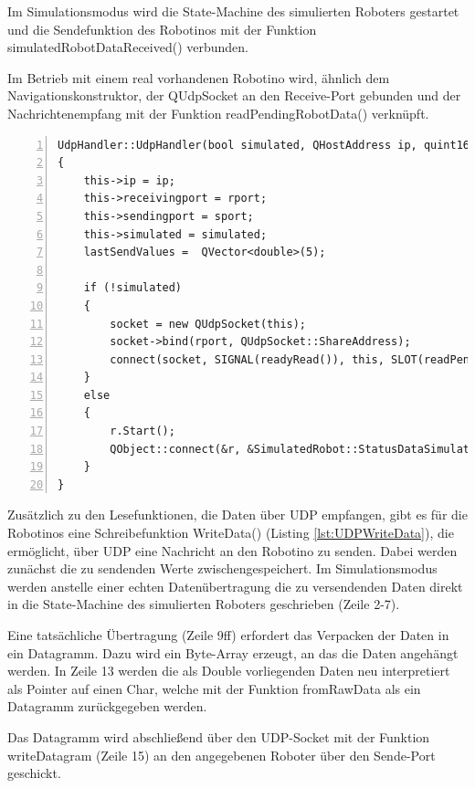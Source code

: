 Im Simulationsmodus wird die State-Machine des simulierten Roboters gestartet und die Sendefunktion des Robotinos mit der Funktion simulatedRobotDataReceived() verbunden.

Im Betrieb mit einem real vorhandenen Robotino wird, ähnlich dem Navigationskonstruktor, der QUdpSocket an den Receive-Port gebunden und der Nachrichtenempfang mit der Funktion readPendingRobotData() verknüpft. 

\begin{lstlisting}[frame=single, breaklines=true, numbers=left, stepnumber=2, firstnumber=1, numberstyle = \tiny, caption=UDP-Handler Konstruktor für Navigationsdatenaustausch,label=lst:KonstruktorUDPRob]
UdpHandler::UdpHandler(bool simulated, QHostAddress ip, quint16 sport, quint16 rport, QObject *parent) : QObject(parent)
{
    this->ip = ip;
    this->receivingport = rport;
    this->sendingport = sport;
    this->simulated = simulated;
    lastSendValues =  QVector<double>(5);

    if (!simulated)
    {
        socket = new QUdpSocket(this);
        socket->bind(rport, QUdpSocket::ShareAddress);
        connect(socket, SIGNAL(readyRead()), this, SLOT(readPendingRobotData()));
    }
    else
    {
        r.Start();
        QObject::connect(&r, &SimulatedRobot::StatusDataSimulatedReceived, this, &UdpHandler::simulatedRobotDataReceived);
    }
}

\end{lstlisting}

Zusätzlich zu den Lesefunktionen, die Daten über UDP empfangen, gibt es für die Robotinos eine Schreibefunktion WriteData() (Listing \ref{lst:UDPWriteData}), die ermöglicht, über UDP eine Nachricht an den Robotino zu senden. Dabei werden zunächst die zu sendenden Werte zwischengespeichert. Im Simulationsmodus werden anstelle einer echten Datenübertragung die zu versendenden Daten direkt in die State-Machine des simulierten Roboters geschrieben (Zeile 2-7). 

Eine tatsächliche Übertragung (Zeile 9ff) erfordert das Verpacken der Daten in ein Datagramm. Dazu wird ein Byte-Array erzeugt, an das die Daten angehängt werden. In Zeile 13 werden die als Double vorliegenden Daten neu interpretiert als Pointer auf einen Char, welche mit der Funktion fromRawData als ein Datagramm zurückgegeben werden. 

Das Datagramm wird abschließend über den UDP-Socket mit der Funktion writeDatagram (Zeile 15) an den angegebenen Roboter über den Sende-Port geschickt. 


